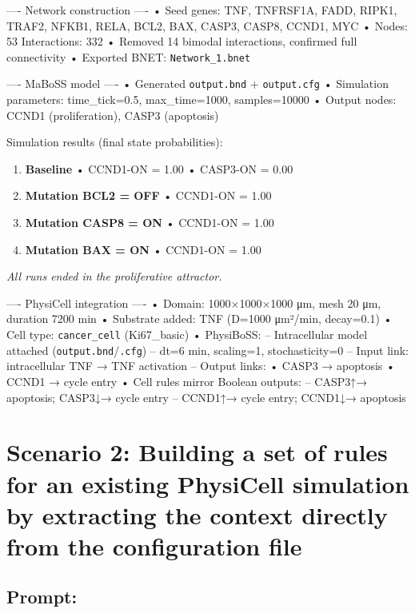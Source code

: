 ---- Network construction ---- • Seed genes: TNF, TNFRSF1A, FADD, RIPK1,
TRAF2, NFKB1, RELA, BCL2, BAX, CASP3, CASP8, CCND1, MYC • Nodes: 53
Interactions: 332 • Removed 14 bimodal interactions, confirmed full
connectivity • Exported BNET: \texttt{Network\_1.bnet}

---- MaBoSS model ---- • Generated \texttt{output.bnd} +
\texttt{output.cfg} • Simulation parameters: time\_tick=0.5,
max\_time=1000, samples=10000 • Output nodes: CCND1 (proliferation),
CASP3 (apoptosis)

Simulation results (final state probabilities):

\begin{enumerate}
\def\labelenumi{\arabic{enumi}.}
\tightlist
\item
  \textbf{Baseline} • CCND1-ON = 1.00 • CASP3-ON = 0.00
\item
  \textbf{Mutation BCL2 = OFF} • CCND1-ON = 1.00
\item
  \textbf{Mutation CASP8 = ON} • CCND1-ON = 1.00
\item
  \textbf{Mutation BAX = ON} • CCND1-ON = 1.00
\end{enumerate}

\emph{All runs ended in the proliferative attractor.}

---- PhysiCell integration ---- • Domain: 1000×1000×1000 μm, mesh 20 μm,
duration 7200 min • Substrate added: TNF (D=1000 μm²/min, decay=0.1) •
Cell type: \texttt{cancer\_cell} (Ki67\_basic) • PhysiBoSS: --
Intracellular model attached (\texttt{output.bnd}/\texttt{.cfg}) -- dt=6
min, scaling=1, stochasticity=0 -- Input link: intracellular TNF → TNF
activation -- Output links: • CASP3 → apoptosis • CCND1 → cycle entry •
Cell rules mirror Boolean outputs: -- CASP3↑→ apoptosis; CASP3↓→ cycle
entry -- CCND1↑→ cycle entry; CCND1↓→ apoptosis

\hypertarget{scenario-2-building-a-set-of-rules-for-an-existing-physicell-simulation-by-extracting-the-context-directly-from-the-configuration-file}{%
\section{Scenario 2: Building a set of rules for an existing PhysiCell
simulation by extracting the context directly from the configuration
file}\label{scenario-2-building-a-set-of-rules-for-an-existing-physicell-simulation-by-extracting-the-context-directly-from-the-configuration-file}}

\hypertarget{prompt-1}{%
\subsection{Prompt:}\label{prompt-1}}


